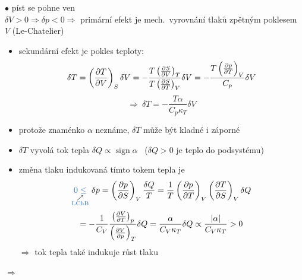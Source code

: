 \begin{priklad}[Př:]
\begin{minipage}{0.55\textwidth}
\end{minipage}
\begin{minipage}{0.43\textwidth}
$\bullet$ píst se pohne ven \\
$\delta V > 0 \Rightarrow \delta p < 0 \Rightarrow$ primární efekt je mech.\ vyrovnání tlaků zpětným poklesem $V$ (Le-Chatelier)
\end{minipage}

\begin{itemize}
  \item sekundární efekt je pokles teploty:
  \[
    \delta T = \left(\pdv{T}{V}\right)_S\delta V
    = -\frac{T\left(\pdv{S}{V}\right)_T}{T\left(\pdv{S}{T}\right)_V}\delta V = -\frac{T\left(\pdv{p}{T}\right)_V}{C_p}\delta V
  \]
  \[
    \Rightarrow\ \delta T = -\frac{T\alpha}{C_p\kappa_T}\delta V
  \]
  \item protože znaménko $\alpha$ neznáme, $\delta T$ může být kladné i záporné
  \item $\delta T$ vyvolá tok tepla $\delta Q \propto \operatorname{sign}\alpha$ \ ($\delta Q > 0$ je teplo do podsystému)
  \item změna tlaku indukovaná tímto tokem tepla je
  \[
    \underset{\substack{\nearrow\\ \modre{\text{LChB}}}}{\modre{0\leq}}\ \delta p = \left(\pdv{p}{S}\right)_V\frac{\delta Q}{T}
    = \frac1T\left(\pdv{p}{T}\right)_V\left(\pdv{T}{S}\right)_V\delta Q
  \]
  \[
    = -\frac{1}{C_V}\frac{\left(\pdv{V}{T}\right)_p}{\left(\pdv{V}{p}\right)_T}\delta Q
    = \frac{\alpha}{C_V\kappa_T}\delta Q \propto \frac{|\alpha|}{C_V\kappa_T} > 0
  \]
  \hspace*{2cm}$\Rightarrow$ tok tepla také indukuje růst tlaku
\end{itemize}
$\Rightarrow$ 
\end{priklad}

